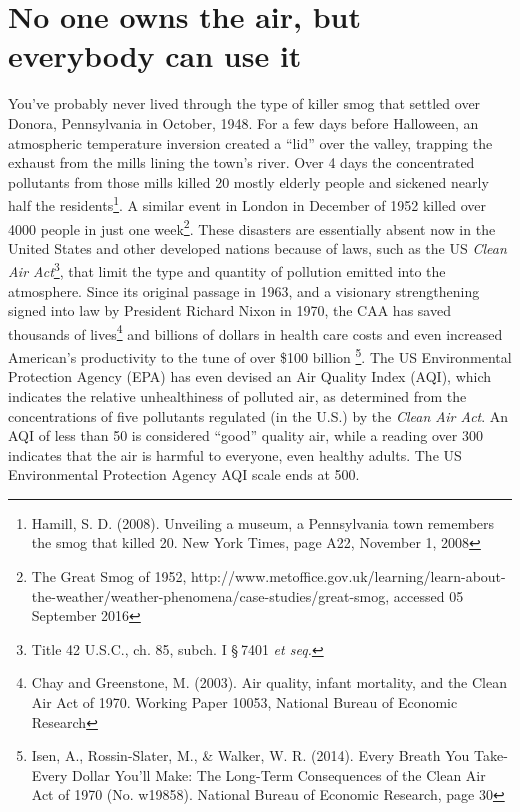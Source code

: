 \documentclass[amstex,12pt]{book}
\begin{document}
\section{No one owns the air, but everybody can use it}
You've probably never lived through the type of killer smog that settled over Donora, Pennsylvania in October, 1948. For a few days before Halloween, an atmospheric temperature inversion created a ``lid'' over the valley, trapping the exhaust from the mills lining the town's river. Over 4 days the concentrated pollutants from those mills killed 20 mostly elderly people and sickened nearly half the residents\footnote{Hamill, S. D. (2008). Unveiling a museum, a Pennsylvania town remembers the smog that killed 20. New York Times, page A22, November 1, 2008}. A similar event in London in December of 1952 killed over 4000 people in just one week\footnote{The Great Smog of 1952, http://www.metoffice.gov.uk/learning/learn-about-the-weather/weather-phenomena/case-studies/great-smog, accessed 05 September 2016}. These disasters are essentially absent now in the United States and other developed nations because of laws, such as the US \emph{Clean Air Act}\footnote{Title 42 U.S.C., ch. 85, subch. I \S 7401 \textit{et seq.}}, that limit the type and quantity of pollution emitted into the atmosphere. Since its original passage in 1963, and a visionary strengthening signed into law by President Richard Nixon in 1970, the CAA has saved thousands of lives\footnote{Chay and Greenstone, M. (2003). Air quality, infant mortality, and the Clean Air Act of 1970. Working Paper 10053, National Bureau of Economic Research} and billions of dollars in health care costs and even increased American's productivity to the tune of over \$100 billion \footnote{Isen, A., Rossin-Slater, M., \& Walker, W. R. (2014). Every Breath You Take-Every Dollar You'll Make: The Long-Term Consequences of the Clean Air Act of 1970 (No. w19858). National Bureau of Economic Research, page 30}. The US Environmental Protection Agency (EPA) has even devised an Air Quality Index (AQI), which indicates the relative unhealthiness of polluted air, as determined from the concentrations of five pollutants regulated (in the U.S.) by the \emph{Clean Air Act}. An AQI of less than 50 is considered ``good'' quality air, while a reading over 300 indicates that the air is harmful to everyone, even healthy adults. The US Environmental Protection Agency AQI scale ends at 500.
\end{document}
